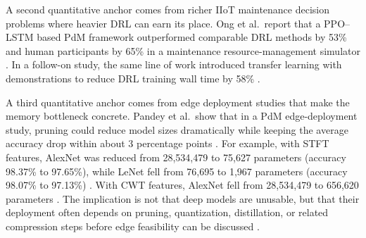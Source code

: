 \documentclass[sn-basic]{sn-jnl} %
\begin{document}
A second quantitative anchor comes from richer IIoT maintenance decision problems where heavier DRL can earn its place. Ong et al.~report that a PPO--LSTM based PdM framework outperformed comparable DRL methods by 53\% and human participants by 65\% in a maintenance resource-management simulator \cite{Ong2022-01}. In a follow-on study, the same line of work introduced transfer learning with demonstrations to reduce DRL training wall time by 58\% \cite{Ong2022-02}.

A third quantitative anchor comes from edge deployment studies that make the memory bottleneck concrete. Pandey et al.~show that in a PdM edge-deployment study, pruning could reduce model sizes dramatically while keeping the average accuracy drop within about 3 percentage points \cite{Pandey2023}. For example, with STFT features, AlexNet was reduced from 28,534,479 to 75,627 parameters (accuracy 98.37\% to 97.65\%), while LeNet fell from 76,695 to 1,967 parameters (accuracy 98.07\% to 97.13\%) \cite{Pandey2023}. With CWT features, AlexNet fell from 28,534,479 to 656,620 parameters \cite{Pandey2023}. The implication is not that deep models are unusable, but that their deployment often depends on pruning, quantization, distillation, or related compression steps before edge feasibility can be discussed \cite{Pandey2023, Jang2020, Xu2022}.
\end{document}
